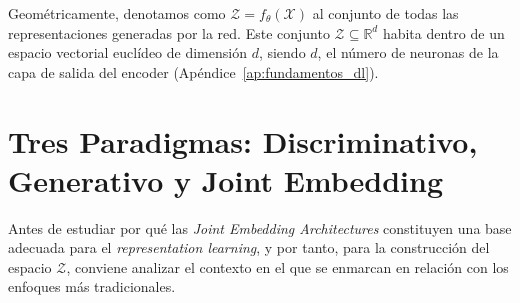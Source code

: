 Geométricamente, denotamos como $\mathcal{Z} = f_{\theta}(\mathcal{X})$ al conjunto de todas las representaciones generadas por la red. Este conjunto $\mathcal{Z} \subseteq \mathbb{R}^d$ habita dentro de un espacio vectorial euclídeo de dimensión $d$, siendo $d$, el número de neuronas de la capa de salida del encoder (Apéndice~\ref{ap:fundamentos_dl}).

\section{Tres Paradigmas: Discriminativo, Generativo y Joint Embedding}
\label{sec:tres_paradigmas}

Antes de estudiar por qué las \textit{Joint Embedding Architectures} constituyen una base adecuada para el \textit{representation learning}, y por tanto, para la construcción del espacio $\mathcal{Z}$, conviene analizar el contexto en el que se enmarcan en relación con los enfoques más tradicionales.


